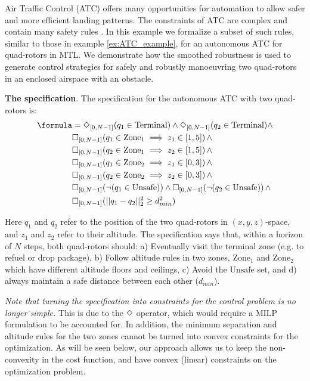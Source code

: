 
Air Traffic Control (ATC) offers many opportunities for automation to allow safer and more efficient landing patterns. 
The constraints of ATC are complex and contain many safety rules \cite{Max_ICRAT16}.
In this example we formalize a subset of such rules, similar to those in example \ref{ex:ATC_example}, for an autonomous ATC for quad-rotors in MTL.
We demonstrate how the smoothed robustness is used to generate control strategies for safely and robustly manoeuvring two quad-rotors in an enclosed airspace with an obstacle. 

\textbf{The specification}.
The specification for the autonomous ATC with two quad-rotors is:
{\small
\begin{subequations}
\begin{align}
\formula &= \eventually_{[0,N-1]}(q_1 \in \text{Terminal}) \land \eventually_{[0,N-1]}(q_2 \in \text{Terminal}) \land   \nonumber \\
& \always_{[0,N-1]} (q_1 \in \text{Zone}_1 \implies z_1 \in [1,5]) \, \land \nonumber \\
& \always_{[0,N-1]} (q_2 \in \text{Zone}_1 \implies z_2 \in [1,5]) \, \land \nonumber \\
& \always_{[0,N-1]} (q_1 \in \text{Zone}_2 \implies z_1 \in [0,3]) \, \land \nonumber \\
& \always_{[0,N-1]} (q_2 \in \text{Zone}_2 \implies z_2 \in [0,3]) \, \land \nonumber \\
& \always_{[0,N-1]} (\neg (q_1 \in \text{Unsafe})) \land \always_{[0,N-1]} (\neg (q_2 \in \text{Unsafe})) \, \land  \nonumber \\
& \always_{[0,N-1]} (||q_1-q_2||_2^2 \geq d_{min}^2)
\end{align}
\end{subequations}
\vspace{-10pt}
}

Here $q_1$ and $q_2$ refer to the position of the two quad-rotors in $(x,y,z)$-space, and $z_1$ and $z_2$ refer to their altitude. 
The specification says that, within a horizon of $N$ steps,  both quad-rotors 
should: 
a) Eventually visit the terminal zone (e.g. to refuel or drop package), 
b) Follow altitude rules in two zones, $\text{Zone}_1$ and $\text{Zone}_2$ which have different altitude floors and ceilings,
c) Avoid the $\text{Unsafe}$ set, and d) always maintain a safe distance between each other ($d_{min}$). 

\textit{Note that turning the specification into constraints for the control problem is no longer simple.}
This is due to the $\Diamond$ operator, which would require a MILP formulation to be accounted for. 
In addition, the minimum separation and altitude rules for the two zones cannot be turned into convex constraints for the optimization. As will be seen below, our approach allows us to keep the non-convexity in the cost function, and have convex (linear) constraints on the optimization problem.

